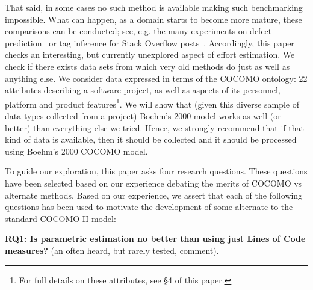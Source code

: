 \documentclass[smallcondesed]{svjour3}
\newenvironment{BLUE}{\color{blue}}{\ignorespacesafterend}
\begin{document}
\begin{BLUE} That said,
in some  cases no such method is available making such  benchmarking impossible. What can happen,
as a   domain starts to become more mature,
these comparisons can be conducted; see, e.g. the
many experiments on defect prediction~\cite{Scanniello2013} or tag inference for Stack Overflow posts~\cite{stanley2013predicting}.
\end{BLUE}
Accordingly, this paper checks an interesting,
but currently unexplored aspect of effort estimation.
We check
if there exists data sets from which  very old methods do just as well as anything else. 
We consider data expressed in terms of the COCOMO ontology: 22 attributes describing
a software project, as well as aspects of its personnel, platform and product features\footnote{For full details on these attributes, see {\S}4 of this paper.}. We will show
that (given this diverse sample of data types collected from a project)   Boehm's 2000 model works
as well (or better) than everything else we tried.  Hence, we strongly recommend that if that kind
of data is available, then it should be collected and it should be processed using Boehm's 2000 COCOMO model.


To guide our exploration,
 this paper asks four research questions.  These
 questions have been selected based  on our experience debating
 the merits of COCOMO vs alternate methods. Based on our experience,
 we assert that each of the following questions has been used to motivate
 the development of some alternate to the standard COCOMO-II model:


{\bf RQ1: Is parametric estimation no better than
   using just Lines of Code measures?} 
  (an   often heard, but rarely tested, comment).
\end{document}

